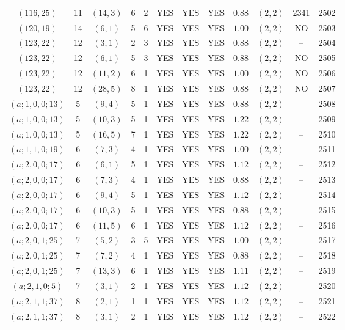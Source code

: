 \begin{longtable}{|c|c|c|c|c|c|c|c|c|c|c|c|}
$(116,25)$ & 11 & $(14,3)$ & 6 & 2 & YES & YES & YES & $0.88$ & $(2,2)$ & 2341 & 2502\\
$(120,19)$ & 14 & $(6,1)$ & 5 & 6 & YES & YES & YES & $1.00$ & $(2,2)$ & NO & 2503\\
$(123,22)$ & 12 & $(3,1)$ & 2 & 3 & YES & YES & YES & $0.88$ & $(2,2)$ & -- & 2504\\
$(123,22)$ & 12 & $(6,1)$ & 5 & 3 & YES & YES & YES & $0.88$ & $(2,2)$ & NO & 2505\\
$(123,22)$ & 12 & $(11,2)$ & 6 & 1 & YES & YES & YES & $1.00$ & $(2,2)$ & NO & 2506\\
$(123,22)$ & 12 & $(28,5)$ & 8 & 1 & YES & YES & YES & $0.88$ & $(2,2)$ & NO & 2507\\
$(a;1,0,0;13)$ & 5 & $(9,4)$ & 5 & 1 & YES & YES & YES & $0.88$ & $(2,2)$ & -- & 2508\\
$(a;1,0,0;13)$ & 5 & $(10,3)$ & 5 & 1 & YES & YES & YES & $1.22$ & $(2,2)$ & -- & 2509\\
$(a;1,0,0;13)$ & 5 & $(16,5)$ & 7 & 1 & YES & YES & YES & $1.22$ & $(2,2)$ & -- & 2510\\
$(a;1,1,0;19)$ & 6 & $(7,3)$ & 4 & 1 & YES & YES & YES & $1.00$ & $(2,2)$ & -- & 2511\\
$(a;2,0,0;17)$ & 6 & $(6,1)$ & 5 & 1 & YES & YES & YES & $1.12$ & $(2,2)$ & -- & 2512\\
$(a;2,0,0;17)$ & 6 & $(7,3)$ & 4 & 1 & YES & YES & YES & $0.88$ & $(2,2)$ & -- & 2513\\
$(a;2,0,0;17)$ & 6 & $(9,4)$ & 5 & 1 & YES & YES & YES & $1.12$ & $(2,2)$ & -- & 2514\\
$(a;2,0,0;17)$ & 6 & $(10,3)$ & 5 & 1 & YES & YES & YES & $0.88$ & $(2,2)$ & -- & 2515\\
$(a;2,0,0;17)$ & 6 & $(11,5)$ & 6 & 1 & YES & YES & YES & $1.12$ & $(2,2)$ & -- & 2516\\
$(a;2,0,1;25)$ & 7 & $(5,2)$ & 3 & 5 & YES & YES & YES & $1.00$ & $(2,2)$ & -- & 2517\\
$(a;2,0,1;25)$ & 7 & $(7,2)$ & 4 & 1 & YES & YES & YES & $0.88$ & $(2,2)$ & -- & 2518\\
$(a;2,0,1;25)$ & 7 & $(13,3)$ & 6 & 1 & YES & YES & YES & $1.11$ & $(2,2)$ & -- & 2519\\
$(a;2,1,0;5)$ & 7 & $(3,1)$ & 2 & 1 & YES & YES & YES & $1.12$ & $(2,2)$ & -- & 2520\\
$(a;2,1,1;37)$ & 8 & $(2,1)$ & 1 & 1 & YES & YES & YES & $1.12$ & $(2,2)$ & -- & 2521\\
$(a;2,1,1;37)$ & 8 & $(3,1)$ & 2 & 1 & YES & YES & YES & $1.12$ & $(2,2)$ & -- & 2522\\

\end{longtable}
